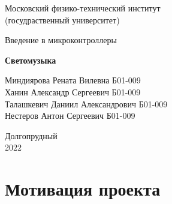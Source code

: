 \documentclass[a4paper, 12pt]{article}%
\begin{document}


\begin{titlepage}

	\newpage
	\begin{center}
		\normalsize Московский физико-технический институт \\(госудраственный 			университет)
	\end{center}

	\vspace{6em}

	\begin{center}
		\Large Введение в микроконтроллеры\\
	\end{center}

	\vspace{1em}

	\begin{center}
		\large \textbf{Светомузыка}
	\end{center}

	\vspace{2em}

	\begin{center}
		\large Миндиярова Рената Вилевна  Б01-009   \\
			Ханин Александр Сергеевич  Б01-009      \\
			Талашкевич Даниил Александрович Б01-009 \\
			Нестеров Антон Сергеевич Б01-009        \\
				
				
	\end{center}

	\vspace{\fill}

	\begin{center}
	Долгопрудный \\2022
	\end{center}
	
\end{titlepage}



	\thispagestyle{empty}
	\newpage
	\tableofcontents
	\newpage
	\setcounter{page}{1}


					
\section{Мотивация проекта}
\end{document}
